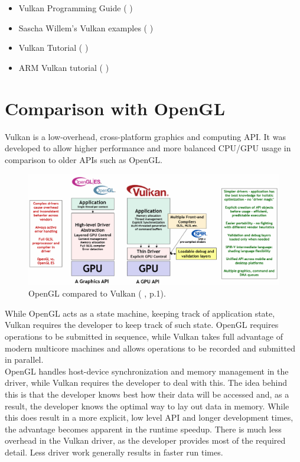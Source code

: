 \documentclass[12pt]{report}
\newcommand{\citebu}[1]{(\citenoparen{#1})}
\newcommand{\citenoparen}[1]{\citeauthor{#1} \citeyear{#1}}
\newcommand{\citediagram}[2]{(\citeauthor{#1} \citeyear{#1}, p.#2)}
\theoremstyle{definition}
\begin{document}
      \begin{itemize}
        \item Vulkan Programming Guide \citebu{vulkanbook}
        \item Sascha Willem's Vulkan examples \citebu{sascha}
        \item Vulkan Tutorial \citebu{vulkantutorial}
        \item ARM Vulkan tutorial \citebu{arm}
      \end{itemize}

    \section{Comparison with OpenGL}

      Vulkan is a low-overhead, cross-platform graphics and computing API.
      It was developed to allow higher performance and more balanced CPU/GPU
      usage in comparison to older APIs such as OpenGL. \\

      \begin{figure}[h]
        \centering
        \includegraphics[width=\textwidth]{images/compare_opengl.png}
        \caption{OpenGL compared to Vulkan \citediagram{vulkan_guide}{1}.}
        \label{fig:compare_opengl}  
      \end{figure}

      While OpenGL acts as a state machine, keeping track of application state,
      Vulkan requires the developer to keep track of such state. OpenGL requires
      operations to be submitted in sequence, while Vulkan takes full advantage
      of modern multicore machines and allows operations to be recorded and
      submitted in parallel. \\

      OpenGL handles host-device synchronization and memory management in the
      driver, while Vulkan requires the developer to deal with this. The idea
      behind this is that the developer knows best how their data will be
      accessed and, as a result, the developer knows the optimal way to lay out
      data in memory. While this does result in a more explicit, low level API
      and longer development times, the advantage becomes apparent in the
      runtime speedup. There is much less overhead in the Vulkan driver, as the
      developer provides most of the required detail. Less driver work
      generally results in faster run times. \\
\end{document}
